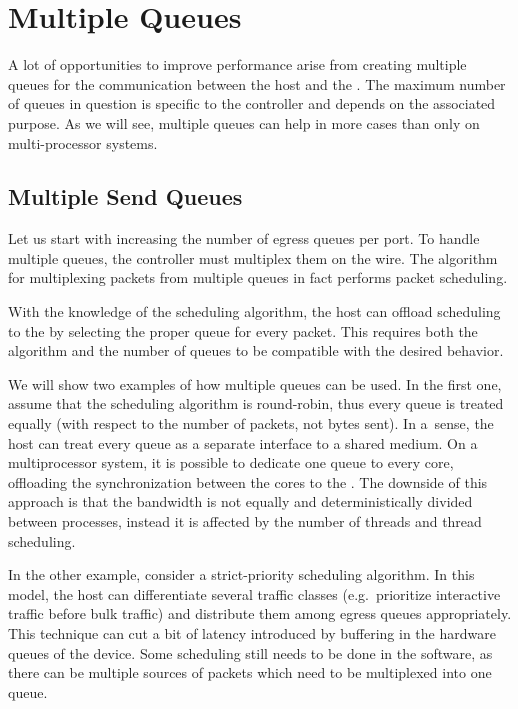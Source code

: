 \section{Multiple Queues}

A lot of opportunities to improve performance arise from creating multiple
queues for the communication between the host and the . The maximum number
of queues in question is specific to the controller and depends on the
associated purpose. As we will see, multiple
queues can help in more cases than only on multi-processor systems.

\subsection{Multiple Send Queues}

Let us start with increasing the number of egress queues per port. To handle
multiple queues, the controller must multiplex them on the wire. The algorithm for
multiplexing packets from multiple queues in fact performs packet scheduling.

With the knowledge of the scheduling algorithm, the host can offload scheduling
to the  by selecting the proper queue for every packet. This requires
both the algorithm and the number of queues to be compatible with the desired
behavior.

We will show two examples of how multiple queues can be used. In the first one, assume that
the scheduling algorithm is round-robin, thus every queue is treated equally
(with respect to the number of packets, not bytes sent). In a~sense, the host can
treat every queue as a separate interface to a shared medium. On
a multiprocessor system, it is possible to dedicate one queue to every core,
offloading the synchronization between the cores to the . The downside of
this approach is that the bandwidth is not equally and deterministically divided
between processes, instead it is affected by the number of threads and thread
scheduling.

In the other example, consider a strict-priority scheduling algorithm. In this
model, the host can differentiate several traffic classes (e.g.\ prioritize
interactive traffic before bulk traffic) and distribute them among egress
queues appropriately. This technique can cut a bit of latency introduced by
buffering in the hardware queues of the device. Some scheduling still needs to
be done in the software, as there can be multiple sources of packets which
need to be multiplexed into one queue.

